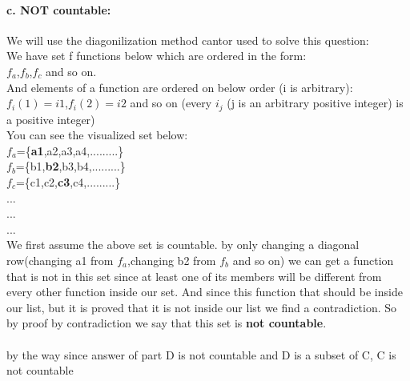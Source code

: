 \documentclass[11pt]{article}
\begin{document}
\paragraph{c. NOT countable:}
We will use the diagonilization method cantor used to solve this question:\\
We have set f functions below which are ordered in the form:\\
$f_a$,$f_b$,$f_c$ and so on.\\
And elements of a function are ordered on below order (i is arbitrary):\\ 
$f_i(1)=i1$,$f_i(2)=i2$ and so on (every $i_j$ (j is an arbitrary positive integer) is a positive integer)\\
You can see the visualized set below:\\
$f_a$=\{\textbf{a1},a2,a3,a4,.........\}\\
$f_b$=\{b1,\textbf{b2},b3,b4,.........\}\\
$f_c$=\{c1,c2,\textbf{c3},c4,.........\}\\
...\\
...\\
...\\
We first assume the above set is countable. by only changing a diagonal row(changing a1 from $f_a$,changing b2 from $f_b$ and so on) we can get a function that is not in this set since at least one of its members will be different from every other function inside our set. And since this function that should be inside our list, but it is proved that it is not inside our list we find a contradiction. So by proof by contradiction we say that this set is \textbf{not countable}.\\
\\
by the way since answer of part D is not countable and D is a subset of C, C is not countable\\
\end{document}
